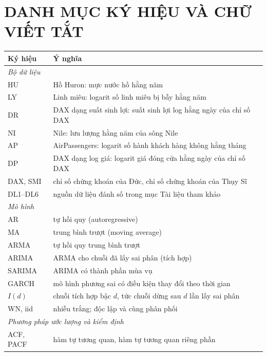 \clearpage
{}
\section*{DANH MỤC KÝ HIỆU VÀ CHỮ VIẾT TẮT}

\begin{center}
\small
\renewcommand{\arraystretch}{1.2}
\begin{tabular}{|p{2.6cm}|p{14.4cm}|}
\toprule
Ký hiệu & Ý nghĩa \\
\midrule
\multicolumn{2}{|l|}{\textit{Bộ dữ liệu}} \\
HU & Hồ Huron: mực nước hồ hằng năm \\
LY & Linh miêu: logarit số linh miêu bị bẫy hằng năm \\
DR & DAX dạng suất sinh lợi: suất sinh lợi log hằng ngày của chỉ số DAX \\
NI & Nile: lưu lượng hằng năm của sông Nile \\
AP & AirPassengers: logarit số hành khách hàng không hằng tháng \\
DP & DAX dạng log giá: logarit giá đóng cửa hằng ngày của chỉ số DAX \\
DAX, SMI & chỉ số chứng khoán của Đức, chỉ số chứng khoán của Thụy Sĩ \\
DL1--DL6 & nguồn dữ liệu đánh số trong mục Tài liệu tham khảo \\
\midrule
\multicolumn{2}{|l|}{\textit{Mô hình}} \\
AR & tự hồi quy (autoregressive) \\
MA & trung bình trượt (moving average) \\
ARMA & tự hồi quy trung bình trượt \\
ARIMA & ARMA cho chuỗi đã lấy sai phân (tích hợp) \\
SARIMA & ARIMA có thành phần mùa vụ \\
GARCH & mô hình phương sai có điều kiện thay đổi theo thời gian \\
$I(d)$ & chuỗi tích hợp bậc $d$, tức chuỗi dừng sau $d$ lần lấy sai phân \\
WN, iid & nhiễu trắng; độc lập và cùng phân phối \\
\midrule
\multicolumn{2}{|l|}{\textit{Phương pháp ước lượng và kiểm định}} \\
ACF, PACF & hàm tự tương quan, hàm tự tương quan riêng phần \\

\end{tabular}
\end{center}
